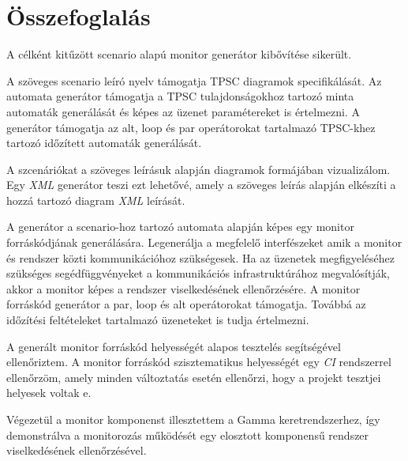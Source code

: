 \chapter{Összefoglalás}

A célként kitűzött scenario alapú monitor generátor kibővítése sikerült.

A szöveges scenario leíró nyelv támogatja TPSC diagramok specifikálását.
Az automata generátor támogatja a TPSC tulajdonságokhoz tartozó minta automaták generálását és képes az üzenet paramétereket is értelmezni.
A generátor támogatja az alt, loop és par operátorokat tartalmazó TPSC-khez tartozó időzített automaták generálását.

A szcenáriókat a szöveges leírásuk alapján diagramok formájában vizualizálom.
Egy \textit{XML} generátor teszi ezt lehetővé, amely a szöveges leírás alapján elkészíti a hozzá tartozó diagram \textit{XML} leírását.

A generátor a scenario-hoz tartozó automata alapján képes egy monitor forráskódjának generálására.
Legenerálja a megfelelő interfészeket amik a monitor és rendszer közti kommunikációhoz szükségesek.
Ha az üzenetek megfigyeléséhez szükséges segédfüggvényeket a kommunikációs infrastruktúrához megvalósítják, akkor a monitor képes a rendszer viselkedésének ellenőrzésére.
A monitor forráskód generátor a par, loop és alt operátorokat támogatja.
Továbbá az időzítési feltételeket tartalmazó üzeneteket is tudja értelmezni.

A generált monitor forráskód helyességét alapos tesztelés segítségével ellenőriztem.
A monitor forráskód szisztematikus helyességét egy \textit{CI} rendszerrel ellenőrzöm, amely minden változtatás esetén ellenőrzi, hogy a projekt tesztjei helyesek voltak e.

Végezetül a monitor komponenst illesztettem a Gamma keretrendszerhez, így demonstrálva a monitorozás működését egy elosztott komponensű rendszer viselkedésének ellenőrzésével.
